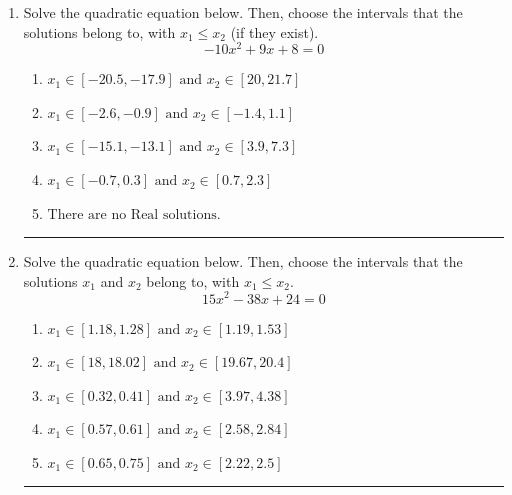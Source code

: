 \documentclass[14pt]{extbook}
\newcommand{\litem}[1]{\item#1\hspace*{-1cm}\rule{\textwidth}{0.4pt}}
\begin{document}
\begin{enumerate}
\litem{
Solve the quadratic equation below. Then, choose the intervals that the solutions belong to, with $x_1 \leq x_2$ (if they exist).\[ -10x^{2} +9 x + 8 = 0 \]\begin{enumerate}[label=\Alph*.]
\item \( x_1 \in [-20.5, -17.9] \text{ and } x_2 \in [20, 21.7] \)
\item \( x_1 \in [-2.6, -0.9] \text{ and } x_2 \in [-1.4, 1.1] \)
\item \( x_1 \in [-15.1, -13.1] \text{ and } x_2 \in [3.9, 7.3] \)
\item \( x_1 \in [-0.7, 0.3] \text{ and } x_2 \in [0.7, 2.3] \)
\item \( \text{There are no Real solutions.} \)

\end{enumerate} }
\litem{
Solve the quadratic equation below. Then, choose the intervals that the solutions $x_1$ and $x_2$ belong to, with $x_1 \leq x_2$.\[ 15x^{2} -38 x + 24 = 0 \]\begin{enumerate}[label=\Alph*.]
\item \( x_1 \in [1.18, 1.28] \text{ and } x_2 \in [1.19, 1.53] \)
\item \( x_1 \in [18, 18.02] \text{ and } x_2 \in [19.67, 20.4] \)
\item \( x_1 \in [0.32, 0.41] \text{ and } x_2 \in [3.97, 4.38] \)
\item \( x_1 \in [0.57, 0.61] \text{ and } x_2 \in [2.58, 2.84] \)
\item \( x_1 \in [0.65, 0.75] \text{ and } x_2 \in [2.22, 2.5] \)


\end{enumerate}}
\end{enumerate}
\end{document}
